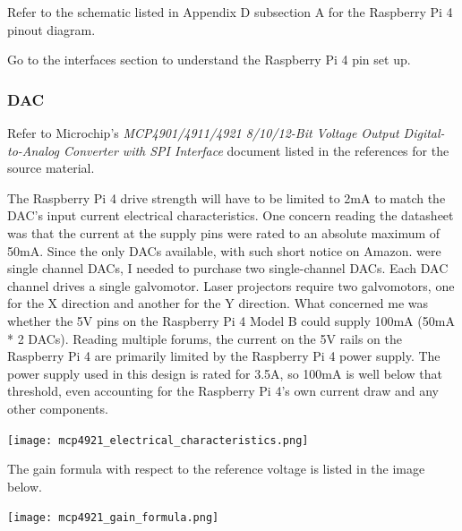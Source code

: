 \documentclass[journal]{IEEEtran}
\begin{document}
    Refer to the schematic listed in Appendix D subsection A for the Raspberry Pi 4 pinout diagram.
    
    Go to the interfaces section to understand the Raspberry Pi 4 pin set up.

    \subsubsection{DAC} 
    
    Refer to Microchip's \emph{MCP4901/4911/4921 8/10/12-Bit Voltage Output Digital-to-Analog Converter with SPI Interface} document listed in the references for the source material.

    The Raspberry Pi 4 drive strength will have to be limited to 2mA to match the DAC's input current electrical characteristics.
    One concern reading the datasheet was that the current at the supply pins were rated to an absolute maximum of 50mA.
    Since the only DACs available, with such short notice on Amazon. were single channel DACs, I needed to purchase two single-channel DACs.
    Each DAC channel drives a single galvomotor. 
    Laser projectors require two galvomotors, one for the X direction and another for the Y direction.
    What concerned me was whether the 5V pins on the Raspberry Pi 4 Model B could supply 100mA (50mA * 2 DACs).
    Reading multiple forums, the current on the 5V rails on the Raspberry Pi 4 are primarily limited by the Raspberry Pi 4 power supply.
    The power supply used in this design is rated for 3.5A, so 100mA is well below that threshold, even accounting for the Raspberry Pi 4's own current draw and any other components. \newline 

    \texttt{[image: mcp4921\_electrical\_characteristics.png]}

    The gain formula with respect to the reference voltage is listed in the image below. \newline

    \texttt{[image: mcp4921\_gain\_formula.png]}
\end{document}
